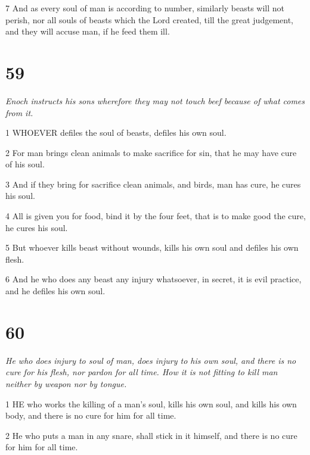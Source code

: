 \par 7 And as every soul of man is according to number, similarly beasts will not perish, nor all souls of beasts which the Lord created, till the great judgement, and they will accuse man, if he feed them ill.

\chapter{59}

\par \textit{Enoch instructs his sons wherefore they may not touch beef because of what comes from it.}

\par 1 WHOEVER defiles the soul of beasts, defiles his own soul.

\par 2 For man brings clean animals to make sacrifice for sin, that he may have cure of his soul.

\par 3 And if they bring for sacrifice clean animals, and birds, man has cure, he cures his soul.

\par 4 All is given you for food, bind it by the four feet, that is to make good the cure, he cures his soul.

\par 5 But whoever kills beast without wounds, kills his own soul and defiles his own flesh.

\par 6 And he who does any beast any injury whatsoever, in secret, it is evil practice, and he defiles his own soul.

\chapter{60}

\par \textit{He who does injury to soul of man, does injury to his own soul, and there is no cure for his flesh, nor pardon for all time. How it is not fitting to kill man neither by weapon nor by tongue.}

\par 1 HE who works the killing of a man's soul, kills his own soul, and kills his own body, and there is no cure for him for all time.

\par 2 He who puts a man in any snare, shall stick in it himself, and there is no cure for him for all time.


